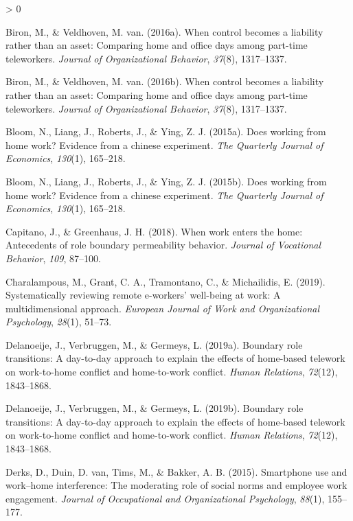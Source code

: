 \documentclass[
  english,
  man]{apa6}
\newlength{\cslhangindent}
\newenvironment{CSLReferences}[2] %
 {%
  \setlength{\parindent}{0pt}
  \ifodd #1 \everypar{\setlength{\hangindent}{\cslhangindent}}\ignorespaces\fi
  \ifnum #2 > 0
  \setlength{\parskip}{#2\baselineskip}
  \fi
 }%
 {}
\begin{document}
\begin{CSLReferences}{1}{0}
\leavevmode\hypertarget{ref-biron_when_2016}{}%
Biron, M., \& Veldhoven, M. van. (2016a). When control becomes a liability rather than an asset: Comparing home and office days among part-time teleworkers. \emph{Journal of Organizational Behavior}, \emph{37}(8), 1317--1337.

\leavevmode\hypertarget{ref-biron_when_2016-1}{}%
Biron, M., \& Veldhoven, M. van. (2016b). When control becomes a liability rather than an asset: Comparing home and office days among part-time teleworkers. \emph{Journal of Organizational Behavior}, \emph{37}(8), 1317--1337.

\leavevmode\hypertarget{ref-bloom_does_2015}{}%
Bloom, N., Liang, J., Roberts, J., \& Ying, Z. J. (2015a). Does working from home work? Evidence from a chinese experiment. \emph{The Quarterly Journal of Economics}, \emph{130}(1), 165--218.

\leavevmode\hypertarget{ref-bloom_does_2015-1}{}%
Bloom, N., Liang, J., Roberts, J., \& Ying, Z. J. (2015b). Does working from home work? Evidence from a chinese experiment. \emph{The Quarterly Journal of Economics}, \emph{130}(1), 165--218.

\leavevmode\hypertarget{ref-capitano_when_2018}{}%
Capitano, J., \& Greenhaus, J. H. (2018). When work enters the home: Antecedents of role boundary permeability behavior. \emph{Journal of Vocational Behavior}, \emph{109}, 87--100.

\leavevmode\hypertarget{ref-charalampous_systematically_2019}{}%
Charalampous, M., Grant, C. A., Tramontano, C., \& Michailidis, E. (2019). Systematically reviewing remote e-workers' well-being at work: A multidimensional approach. \emph{European Journal of Work and Organizational Psychology}, \emph{28}(1), 51--73.

\leavevmode\hypertarget{ref-delanoeije_boundary_2019}{}%
Delanoeije, J., Verbruggen, M., \& Germeys, L. (2019a). Boundary role transitions: A day-to-day approach to explain the effects of home-based telework on work-to-home conflict and home-to-work conflict. \emph{Human Relations}, \emph{72}(12), 1843--1868.

\leavevmode\hypertarget{ref-delanoeije_boundary_2019-1}{}%
Delanoeije, J., Verbruggen, M., \& Germeys, L. (2019b). Boundary role transitions: A day-to-day approach to explain the effects of home-based telework on work-to-home conflict and home-to-work conflict. \emph{Human Relations}, \emph{72}(12), 1843--1868.

\leavevmode\hypertarget{ref-derks_smartphone_2015}{}%
Derks, D., Duin, D. van, Tims, M., \& Bakker, A. B. (2015). Smartphone use and work--home interference: The moderating role of social norms and employee work engagement. \emph{Journal of Occupational and Organizational Psychology}, \emph{88}(1), 155--177.


\end{CSLReferences}
\end{document}
